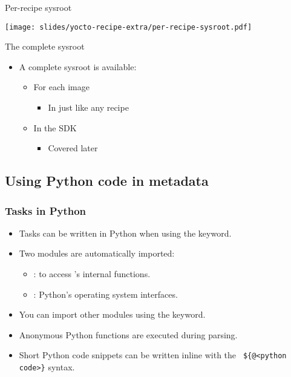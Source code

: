 \begin{frame}{Per-recipe sysroot}
  \begin{center}
    \texttt{[image: slides/yocto-recipe-extra/per-recipe-sysroot.pdf]}
  \end{center}
\end{frame}

\begin{frame}{The complete sysroot}
  \begin{itemize}
  \item A complete sysroot is available:
    \begin{itemize}
      \item For each image
        \begin{itemize}
          \item In  just like any recipe
        \end{itemize}
      \item In the SDK
        \begin{itemize}
          \item Covered later
        \end{itemize}
    \end{itemize}
  \end{itemize}
\end{frame}

\subsection{Using Python code in metadata}

\begin{frame}
  \frametitle{Tasks in Python}
  \begin{itemize}
    \item Tasks can be written in Python when using the 
      keyword.
    \item Two modules are automatically imported:
      \begin{itemize}
        \item {}: to access 's internal functions.
        \item {}: Python's operating system interfaces.
      \end{itemize}
    \item You can import other modules using the 
      keyword.
    \item Anonymous Python functions are executed during parsing.
      \item Short Python code snippets can be written inline with the {\tt
        \$\{@<python code>\}} syntax.
  \end{itemize}
\end{frame}

